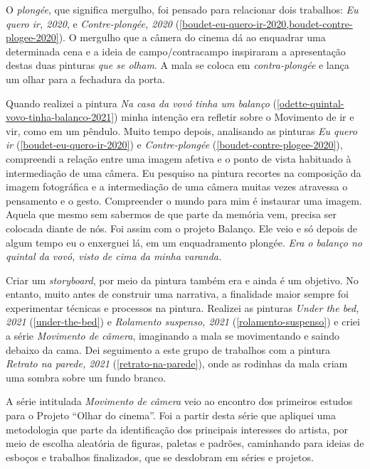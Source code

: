 O \emph{plongée}, que significa mergulho, foi pensado para relacionar
dois trabalhos: \emph{Eu quero ir, 2020}, e \emph{Contre-plongée,
2020} (\cref{boudet-eu-quero-ir-2020,boudet-contre-plogee-2020}). O mergulho que a câmera do cinema dá ao enquadrar uma
determinada cena e a ideia de campo/contracampo inspiraram a
apresentação destas duas pinturas \emph{que se olham}. A mala se coloca
em \emph{contra-plongée} e lança um olhar para a fechadura da porta.

Quando realizei a pintura \emph{Na casa da vovó tinha um balanço}
(\cref{odette-quintal-vovo-tinha-balanco-2021}) minha intenção era
refletir sobre o Movimento de ir e vir, como em um pêndulo. Muito tempo
depois, analisando as pinturas \emph{Eu quero ir}
(\cref{boudet-eu-quero-ir-2020}) e \emph{Contre-plongée}
(\cref{boudet-contre-plogee-2020}), compreendi a relação entre uma
imagem afetiva e o ponto de vista habituado à intermediação de uma
câmera. Eu pesquiso na pintura recortes na composição da imagem
fotográfica e a intermediação de uma câmera muitas vezes atravessa o
pensamento e o gesto. Compreender o mundo para mim é instaurar uma
imagem. Aquela que mesmo sem sabermos de que parte da memória vem,
precisa ser colocada diante de nós. Foi assim com o projeto Balanço.
Ele veio e só depois de algum tempo eu o enxerguei lá, em um
enquadramento plongée. \emph{Era o balanço no quintal da vovó, visto de
	cima da minha varanda.}

Criar um \emph{storyboard}, por meio da pintura também era e ainda é um
objetivo. No entanto, muito antes de construir uma narrativa, a
finalidade maior sempre foi experimentar técnicas e processos na
pintura. Realizei as pinturas \emph{Under the bed, 2021} (\cref{under-the-bed}) e
\emph{Rolamento suspenso, 2021} (\cref{rolamento-suspenso}) e criei a série \emph{Movimento de
	câmera}, imaginando a mala se movimentando e saindo debaixo da cama.
Dei seguimento a este grupo de trabalhos com a pintura \emph{Retrato na
parede, 2021} (\cref{retrato-na-parede}), onde as rodinhas da mala criam uma sombra sobre um fundo
branco.

A série intitulada \emph{Movimento de câmera} veio ao encontro dos
primeiros estudos para o Projeto \enquote{Olhar do cinema}. Foi a
partir desta série que apliquei uma metodologia que parte da
identificação dos principais interesses do artista, por meio de escolha
aleatória de figuras, paletas e padrões, caminhando para ideias de
esboços e trabalhos finalizados, que se desdobram em séries e projetos.

\newpage

